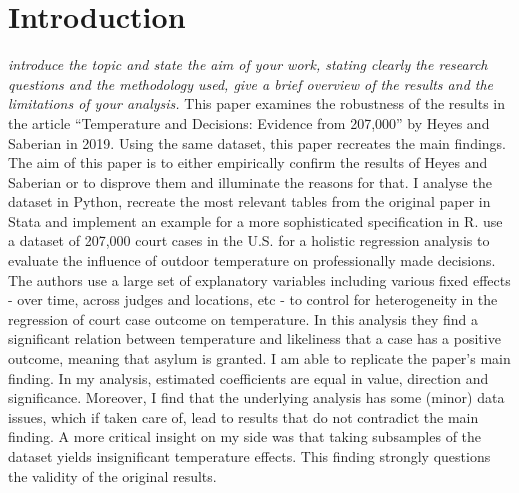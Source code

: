 \documentclass[11pt]{article}
\begin{document}
	\section{Introduction}
	\textit{introduce the topic and state the aim of your work, stating clearly the research questions and the methodology used, give a brief overview of the results and the limitations of your analysis.}
	\newline This paper examines the robustness of the results in the article “Temperature and Decisions: Evidence from 207,000” by Heyes and Saberian in 2019. Using the same dataset, this paper recreates the main findings. The aim of this paper is to either empirically confirm the results of Heyes and Saberian or to disprove them and illuminate the reasons for that. I analyse the dataset in Python, recreate the most relevant tables from the original paper in Stata and implement an example for a more sophisticated specification in R.
	\newline \cite{Heyes.2019} use a dataset of 207,000 court cases in the U.S. for a holistic regression analysis to evaluate the influence of outdoor temperature on professionally made decisions. The authors use a large set of explanatory variables including various fixed effects - over time, across judges and locations, etc - to control for heterogeneity in the regression of court case outcome on temperature. In this analysis they find a significant relation between temperature and likeliness that a case has a positive outcome, meaning that asylum is granted.
	\newline I am able to replicate the paper’s main finding. In my analysis, estimated coefficients are equal in value, direction and significance. Moreover, I find that the underlying analysis has some (minor) data issues, which if taken care of, lead to results that do not contradict the main finding. A more critical insight on my side was that taking subsamples of the dataset yields insignificant temperature effects. This finding strongly questions the validity of the original results. 
\end{document}
